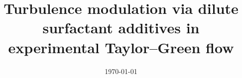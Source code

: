 \documentclass[aps,prl,preprint,groupedaddress]{revtex4-2}
\begin{document}

\title{Turbulence modulation via dilute surfactant additives in experimental Taylor--Green flow}


\author{}
\affiliation{}


\date{\today}

\begin{abstract}
\end{abstract}


\maketitle

\section{}
\end{document}
